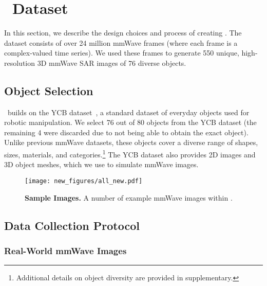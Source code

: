 \vspace{-0.1pt}
\section{\name\ Dataset}
\label{sec:dataset}
\vspace{-0.03in}




In this section, we describe the design choices and process of creating \name. The dataset consists of over 24 million mmWave frames (where each frame is a complex-valued time series). We used these frames to generate 550 unique, high-resolution 3D mmWave SAR images of 76 diverse objects.


\subsection{Object Selection}
\vspace{-0.03in}

\name\ builds on the YCB dataset~\cite{ycb}, a standard dataset of everyday objects used for robotic manipulation. We select 76 out of 80 objects from the YCB dataset (the remaining 4 were discarded due to not being able to obtain the exact object). Unlike previous mmWave datasets, these objects cover a diverse range of shapes, sizes, materials, and categories.\footnote{Additional details on object diversity  are provided in  supplementary.} The YCB dataset also provides 2D images and 3D object meshes, which we use to simulate mmWave images. 

\begin{figure*}
\centering
\vspace{-0.1in}
    \texttt{[image: new\_figures/all\_new.pdf]}
    \vspace{-0.125in}
    \caption{\footnotesize{\textbf{Sample Images.}} \textnormal{A number of example mmWave images within \name.}  }
    \label{fig:all_img}
    \vspace{-0.25in}
\end{figure*}


\vspace{-0.03in}
\subsection{Data Collection Protocol}
\vspace{-0.03in}

\subsubsection{Real-World mmWave Images}
\vspace{-0.03in}

